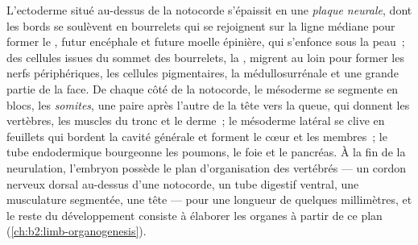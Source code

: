 \begin{proposition}\label{prop:b2:vertebrate-development:neurulation}
L'ectoderme situé au-dessus de la notocorde s'épaissit en une
\emph{plaque neurale}, dont les bords se soulèvent en bourrelets qui se
rejoignent sur la ligne médiane pour former le \emph{}, futur
encéphale et future moelle épinière, qui s'enfonce sous la peau~; des
cellules issues du sommet des bourrelets, la \emph{},
migrent au loin pour former les nerfs périphériques, les cellules
pigmentaires, la médullosurrénale et une grande partie de la face. De
chaque côté de la notocorde, le mésoderme se segmente en blocs, les
\emph{somites}, une paire après l'autre de la tête vers la queue, qui
donnent les vertèbres, les muscles du tronc et le derme~; le mésoderme
latéral se clive en feuillets qui bordent la cavité générale et forment
le cœur et les membres~; le tube endodermique bourgeonne les poumons, le
foie et le pancréas. À la fin de la neurulation, l'embryon possède le
plan d'organisation des vertébrés --- un cordon nerveux dorsal au-dessus
d'une notocorde, un tube digestif ventral, une musculature segmentée,
une tête --- pour une longueur de quelques millimètres, et le reste du
développement consiste à élaborer les organes à partir de ce plan
(\cref{ch:b2:limb-organogenesis}).
\end{proposition}

